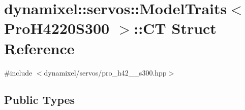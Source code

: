 \hypertarget{structdynamixel_1_1servos_1_1_model_traits_3_01_pro_h4220_s300_01_4_1_1_c_t}{}\section{dynamixel\+:\+:servos\+:\+:Model\+Traits$<$ Pro\+H4220\+S300 $>$\+:\+:CT Struct Reference}
\label{structdynamixel_1_1servos_1_1_model_traits_3_01_pro_h4220_s300_01_4_1_1_c_t}


{\ttfamily \#include $<$dynamixel/servos/pro\+\_\+h42\+\_\+\_\+s300.\+hpp$>$}

\subsection*{Public Types}
